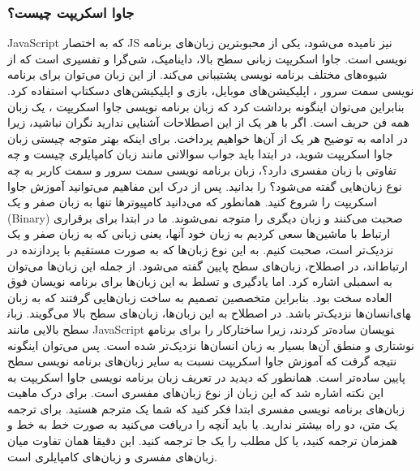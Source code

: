 \subsubsection{جاوا اسکریپت چیست؟}
JavaScript که به اختصار JS نیز نامیده می‌شود، یکی از محبوبترین زبان‌های برنامه نویسی است. جاوا اسکریپت زبانی سطح بالا، داینامیک، شی‌گرا و تفسیری است که از شیوه‌های مختلف برنامه نویسی پشتیبانی می‌کند. از این زبان می‌توان برای برنامه نویسی 
سمت سرور
، اپلیکیشن‌های موبایل، بازی و اپلیکیشن‌های دسکتاپ استفاده کرد. بنابراین می‌توان اینگونه برداشت کرد که زبان برنامه نویسی جاوا اسکریپت ، یک زبان همه فن حریف است.
اگر با هر یک از این اصطلاحات آشنایی ندارید نگران نباشید، زیرا در ادامه به توضیح هر یک از آن‌ها خواهیم پرداخت. برای اینکه بهتر متوجه چیستی زبان جاوا اسکریپت شوید، در ابتدا باید جواب سوالاتی مانند زبان کامپایلری چیست و چه تفاوتی با زبان مفسری دارد؟، زبان برنامه نویسی سمت سرور و سمت کاربر به چه نوع زبان‌هایی گفته می‌شود؟ را بدانید. پس از درک این مفاهیم می‌توانید آموزش جاوا اسکریپت را شروع کنید.
همانطور که می‌دانید کامپیوترها تنها به زبان صفر و یک (Binary) صحبت می‌کنند و زبان دیگری را متوجه نمی‌شوند. ما در ابتدا برای برقراری ارتباط با ماشین‌ها سعی کردیم به زبان خود آنها، یعنی زبانی که به زبان صفر و یک نزدیک‌تر است، صحبت کنیم. به این نوع زبان‌ها که به صورت مستقیم با پردازنده در ارتباط‌اند، در اصطلاح، زبان‌های سطح 
پایین
 گفته می‌شود. از جمله این زبان‌ها می‌توان به اسمبلی اشاره کرد.
اما یادگیری و تسلط به این زبان‌ها برای برنامه نویسان فوق العاده سخت بود. بنابراین متخصصین تصمیم به ساخت زبان‌هایی گرفتند که به زبان انسان‌ها نزدیک‌تر باشد. در اصطلاح به این زبان‌ها، زبان‌های سطح 
بالا
 می‌گویند. زبان‎های سطح بالایی مانند JavaScript کار را برای برنامه‎نویسان ساده‌تر کردند، زیرا ساختار نوشتاری و منطق آن‌ها بسیار به زبان انسان‌ها نزدیک‌تر شده است. پس می‌توان اینگونه نتیجه گرفت که آموزش جاوا اسکریپت نسبت به سایر زبان‌های برنامه نویسی سطح پایین ساده‌تر است.
همانطور که دیدید در تعریف زبان برنامه نویسی جاوا اسکریپت به این نکته اشاره شد که این زبان از نوع زبان‌های مفسری است. برای درک ماهیت زبان‌های برنامه نویسی مفسری ابتدا فکر کنید که شما یک مترجم هستید. برای ترجمه یک متن، دو راه بیشتر ندارید. یا باید آنچه را دریافت می‌کنید به صورت خط به خط و همزمان ترجمه کنید، یا کل مطلب را یک جا ترجمه کنید. این دقیقا همان تفاوت میان زبان‌های 
مفسری
 و زبان‌های 
کامپایلری
 است.

